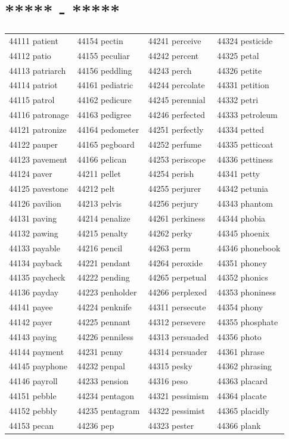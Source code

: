 \documentclass[10pt, oneside]{book}
\begin{document}
\begin{table}[h]
	\centering
	\section*{***** - *****}
	\begin{tabular}{l l l l}
44111 patient &44154 pectin &44241 perceive &44324 pesticide\\
44112 patio &44155 peculiar &44242 percent &44325 petal\\
44113 patriarch &44156 peddling &44243 perch &44326 petite\\
44114 patriot &44161 pediatric &44244 percolate &44331 petition\\
44115 patrol &44162 pedicure &44245 perennial &44332 petri\\
44116 patronage &44163 pedigree &44246 perfected &44333 petroleum\\
44121 patronize &44164 pedometer &44251 perfectly &44334 petted\\
44122 pauper &44165 pegboard &44252 perfume &44335 petticoat\\
44123 pavement &44166 pelican &44253 periscope &44336 pettiness\\
44124 paver &44211 pellet &44254 perish &44341 petty\\
44125 pavestone &44212 pelt &44255 perjurer &44342 petunia\\
44126 pavilion &44213 pelvis &44256 perjury &44343 phantom\\
44131 paving &44214 penalize &44261 perkiness &44344 phobia\\
44132 pawing &44215 penalty &44262 perky &44345 phoenix\\
44133 payable &44216 pencil &44263 perm &44346 phonebook\\
44134 payback &44221 pendant &44264 peroxide &44351 phoney\\
44135 paycheck &44222 pending &44265 perpetual &44352 phonics\\
44136 payday &44223 penholder &44266 perplexed &44353 phoniness\\
44141 payee &44224 penknife &44311 persecute &44354 phony\\
44142 payer &44225 pennant &44312 persevere &44355 phosphate\\
44143 paying &44226 penniless &44313 persuaded &44356 photo\\
44144 payment &44231 penny &44314 persuader &44361 phrase\\
44145 payphone &44232 penpal &44315 pesky &44362 phrasing\\
44146 payroll &44233 pension &44316 peso &44363 placard\\
44151 pebble &44234 pentagon &44321 pessimism &44364 placate\\
44152 pebbly &44235 pentagram &44322 pessimist &44365 placidly\\
44153 pecan &44236 pep &44323 pester &44366 plank\\
	\end{tabular}
 \end{table}
\end{document}
